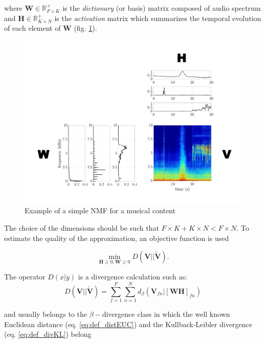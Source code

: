 \documentclass[twocolumn,a4paper,10pt]{article}
\begin{document}
where $\mathbf{W} \in \mathbb{R}^+_{F \times K}$ is the \textit{dictionary} (or basis) matrix composed of audio spectrum and $\mathbf{H} \in \mathbb{R}^+_{K \times N}$ is the \textit{activation} matrix which summarizes the temporal evolution of each element of $\mathbf{W}$ (fig.  \ref{fig:example_NMF}).

\begin{figure}[t]
\centering
\includegraphics[width=0.9\linewidth]{../image/schema_introduction_nmf.pdf}
\caption{Example of a simple NMF  for a musical content \cite{bertin_les_2009}}
\label{fig:example_NMF}
\end{figure}

The choice of the dimensions should be such that $F\times K + K \times N < F \times N$. To estimate the quality of the approximation, an objective function is used

\begin{equation}\label{eq:min-D-WH}
\underset{\mathbf{H} \geq 0, \mathbf{W} \geq 0}{\min} D\left(\mathbf{V} \vert \vert \mathbf{\tilde{V}}\right).
\end{equation}

The operator $D(x\vert y)$ is a divergence calculation such as:
\begin{equation}
D\left(\textbf{V} \vert\vert \mathbf{\tilde{V}} \right) = \sum_{f = 1}^{F} \sum_{n = 1}^{N} d_{\beta}
\left(\textbf{V}_{fn} \vert \left[ \textbf{WH} \right]_{fn} \right)
\end{equation}

and usually belongs to the $\beta-$divergence class \cite{fevotte_nonnegative_2009} in which the well known Euclidean distance (eq. \ref{eq:def_distEUC}) and the Kullback-Leibler divergence (eq. \ref{eq:def_divKL}) belong
\end{document}
